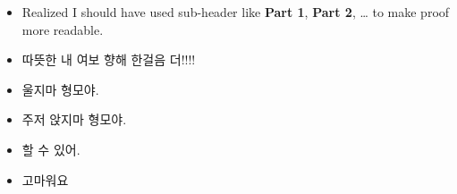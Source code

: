 \documentclass[12pt]{article}
\begin{document}
\begin{enumerate}[a.]
\begin{itemize}
        \bigskip

        \item Realized I should have used sub-header like \textbf{Part 1}, \textbf{Part 2}, \dots
        to make proof more readable.

        \item 따뜻한 내 여보 향해 한걸음 더!!!!
        \item 울지마 형모야.
        \item 주저 앉지마 형모야.
        \item 할 수 있어.
        \item 고마워요
    \end{itemize}

\end{enumerate}
\end{document}
